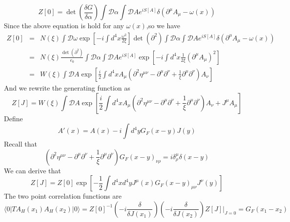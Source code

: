 \documentclass[cyan]{elegantnote}
\begin{document}
\[Z[0] = \det \left( \frac{\delta G}{\delta \alpha} \right) \int \mathcal{D}\alpha \int \mathcal{D}A e^{iS[A]} \delta(\partial^{\mu}A_{\mu} - \omega(x))\]
Since the above equation is hold for any $\omega(x)$,so we have
\begin{eqnarray}
Z[0] &=& N(\xi) \int \mathcal{D}\omega \exp\left[ -i \int d^4x \frac{\omega^2}{2\xi} \right] \det(\partial^2) \int \mathcal{D}\alpha \int \mathcal{D}A e^{iS[A]} \delta(\partial^{\mu}A_{\mu} - \omega(x)) \nonumber \\
&=& N(\xi) \frac{\det(\partial^2)}{e_0} \int \mathcal{D}\alpha \int \mathcal{D}A e^{iS[A]} \exp\left[ -i \int d^4x \frac{1}{2\xi} (\partial^{\mu}A_{\mu})^2\right] \nonumber \\
&=& W(\xi) \int \mathcal{D}A \exp\left[ \frac{i}{2} \int d^4x  A_{\mu} (\partial^2\eta^{\mu\nu} - \partial^{\mu}\partial^{\nu} + \frac{1}{\xi} \partial^{\mu} \partial^{\nu})A_{\nu}\right] \nonumber
\end{eqnarray}
And we rewrite the generating function as
\[Z[J] = W(\xi) \int \mathcal{D}A \exp\left[ \frac{i}{2} \int d^4x  A_{\mu} (\partial^2\eta^{\mu\nu} - \partial^{\mu}\partial^{\nu} + \frac{1}{\xi} \partial^{\mu} \partial^{\nu})A_{\nu} + J^{\mu} A_{\mu}\right]\]
Define
\[A'(x) = A(x) - i \int d^4y G_F(x-y)J(y)\]
Recall that
\[(\partial^2\eta^{\mu\nu} - \partial^{\mu}\partial^{\nu} + \frac{1}{\xi} \partial^{\mu} \partial^{\nu})G_F(x-y)_{\nu \rho} = i\delta^{\mu}_{\rho}\delta(x-y)\]
We can derive that
\[Z[J]=Z[0] \exp \left[ -\frac{1}{2} \int d^4x d^4y J^{\mu}(x) G_F(x-y)_{\mu\nu}J^{\nu}(y) \right]\]
The two point correlation functions are
\[\langle 0 | T A_H(x_1) A_H(x_2)| 0 \rangle = Z[0]^{-1} \left(-i \frac{\delta}{\delta J(x_1)} \right) \left(-i \frac{\delta}{\delta J(x_2)} \right) Z[J]\bigg|_{J=0} = G_F(x_1-x_2) \]
\end{document}
